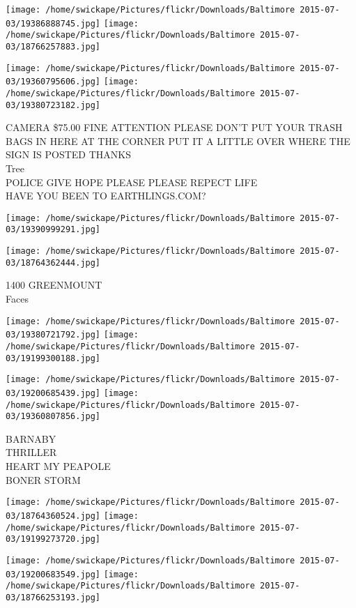 \documentclass[10pt,letterpaper]{article}
\begin{document}
\texttt{[image: /home/swickape/Pictures/flickr/Downloads/Baltimore 2015-07-03/19386888745.jpg]}
\texttt{[image: /home/swickape/Pictures/flickr/Downloads/Baltimore 2015-07-03/18766257883.jpg]}

\texttt{[image: /home/swickape/Pictures/flickr/Downloads/Baltimore 2015-07-03/19360795606.jpg]}
\texttt{[image: /home/swickape/Pictures/flickr/Downloads/Baltimore 2015-07-03/19380723182.jpg]}

CAMERA \$75.00 FINE ATTENTION PLEASE DON'T PUT YOUR TRASH BAGS IN HERE AT THE CORNER PUT IT A LITTLE OVER WHERE THE SIGN IS POSTED THANKS\\
Tree\\
POLICE GIVE HOPE PLEASE PLEASE REPECT LIFE\\
HAVE YOU BEEN TO EARTHLINGS.COM?\\
\pagebreak

\texttt{[image: /home/swickape/Pictures/flickr/Downloads/Baltimore 2015-07-03/19390999291.jpg]}

\vspace{0.25in}
\texttt{[image: /home/swickape/Pictures/flickr/Downloads/Baltimore 2015-07-03/18764362444.jpg]}

1400 GREENMOUNT\\
Faces\\
\pagebreak

\texttt{[image: /home/swickape/Pictures/flickr/Downloads/Baltimore 2015-07-03/19380721792.jpg]}
\texttt{[image: /home/swickape/Pictures/flickr/Downloads/Baltimore 2015-07-03/19199300188.jpg]}

\texttt{[image: /home/swickape/Pictures/flickr/Downloads/Baltimore 2015-07-03/19200685439.jpg]}
\texttt{[image: /home/swickape/Pictures/flickr/Downloads/Baltimore 2015-07-03/19360807856.jpg]}

BARNABY\\
THRILLER\\
HEART MY PEAPOLE\\
BONER STORM\\
\pagebreak

\texttt{[image: /home/swickape/Pictures/flickr/Downloads/Baltimore 2015-07-03/18764360524.jpg]}
\texttt{[image: /home/swickape/Pictures/flickr/Downloads/Baltimore 2015-07-03/19199273720.jpg]}

\texttt{[image: /home/swickape/Pictures/flickr/Downloads/Baltimore 2015-07-03/19200683549.jpg]}
\texttt{[image: /home/swickape/Pictures/flickr/Downloads/Baltimore 2015-07-03/18766253193.jpg]}
\end{document}
